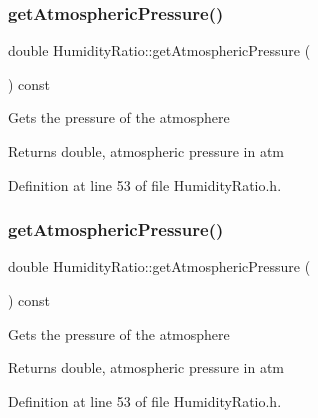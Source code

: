 \subsubsection{\texorpdfstring{get\+Atmospheric\+Pressure()}{getAtmosphericPressure()}\hspace{0.1cm}{\footnotesize\ttfamily [1/3]}}
{\footnotesize\ttfamily double Humidity\+Ratio\+::get\+Atmospheric\+Pressure (\begin{DoxyParamCaption}{ }\end{DoxyParamCaption}) const\hspace{0.3cm}{\ttfamily [inline]}}

Gets the pressure of the atmosphere

\begin{DoxyReturn}{Returns}
double, atmospheric pressure in atm 
\end{DoxyReturn}


Definition at line 53 of file Humidity\+Ratio.\+h.

\mbox{\label{class_humidity_ratio_a7814687795a87a3822e4584773938741}} 
\subsubsection{\texorpdfstring{get\+Atmospheric\+Pressure()}{getAtmosphericPressure()}\hspace{0.1cm}{\footnotesize\ttfamily [2/3]}}
{\footnotesize\ttfamily double Humidity\+Ratio\+::get\+Atmospheric\+Pressure (\begin{DoxyParamCaption}{ }\end{DoxyParamCaption}) const\hspace{0.3cm}{\ttfamily [inline]}}

Gets the pressure of the atmosphere

\begin{DoxyReturn}{Returns}
double, atmospheric pressure in atm 
\end{DoxyReturn}


Definition at line 53 of file Humidity\+Ratio.\+h.

\mbox{\label{class_humidity_ratio_a7814687795a87a3822e4584773938741}} 
